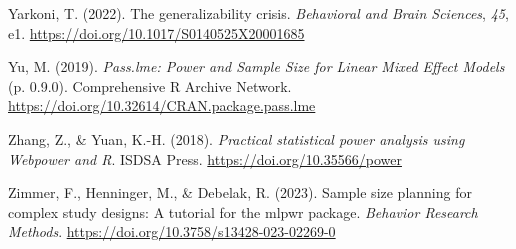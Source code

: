 \documentclass[
  man,
  floatsintext,
  longtable,
  a4paper,
  nolmodern,
  notxfonts,
  notimes,
  colorlinks=true,linkcolor=blue,citecolor=blue,urlcolor=blue]{apa7}
\newlength{\cslhangindent}
\newenvironment{CSLReferences}[2] %
 {\begin{list}{}{%
  \setlength{\itemindent}{0pt}
  \setlength{\leftmargin}{0pt}
  \setlength{\parsep}{0pt}
  \ifodd #1
   \setlength{\leftmargin}{\cslhangindent}
   \setlength{\itemindent}{-1\cslhangindent}
  \fi
  \setlength{\itemsep}{#2\baselineskip}}}
 {\end{list}}
\begin{document}
\begin{CSLReferences}{1}{0}
Yarkoni, T. (2022). The generalizability crisis. \emph{Behavioral and
Brain Sciences}, \emph{45}, e1.
\url{https://doi.org/10.1017/S0140525X20001685}

Yu, M. (2019). \emph{Pass.lme: {Power} and {Sample Size} for {Linear
Mixed Effect Models}} (p. 0.9.0). Comprehensive R Archive Network.
\url{https://doi.org/10.32614/CRAN.package.pass.lme}

Zhang, Z., \& Yuan, K.-H. (2018). \emph{Practical statistical power
analysis using {Webpower} and {R}}. ISDSA Press.
\url{https://doi.org/10.35566/power}

Zimmer, F., Henninger, M., \& Debelak, R. (2023). Sample size planning
for complex study designs: {A} tutorial for the mlpwr package.
\emph{Behavior Research Methods}.
\url{https://doi.org/10.3758/s13428-023-02269-0}

\end{CSLReferences}
\end{document}
